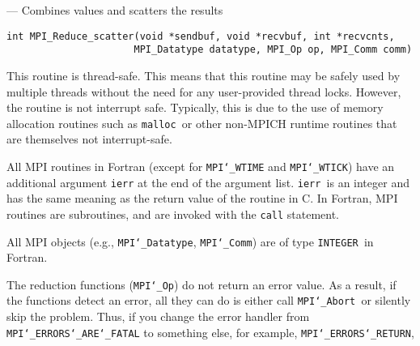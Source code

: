 \startmanpage
{}
--- Combines values and scatters the results 
\startvb\begin{verbatim}
int MPI_Reduce_scatter(void *sendbuf, void *recvbuf, int *recvcnts, 
                      MPI_Datatype datatype, MPI_Op op, MPI_Comm comm)

\end{verbatim}
\endvb

\par
{}
\par
{}
\par
This routine is thread-safe.  This means that this routine may be
safely used by multiple threads without the need for any user-provided
thread locks.  However, the routine is not interrupt safe.  Typically,
this is due to the use of memory allocation routines such as {\tt malloc
}or other non-MPICH runtime routines that are themselves not interrupt-safe.
\par
{}
All MPI routines in Fortran (except for {\tt MPI{\tt \char`\_}WTIME} and {\tt MPI{\tt \char`\_}WTICK}) have
an additional argument {\tt ierr} at the end of the argument list.  {\tt ierr
}is an integer and has the same meaning as the return value of the routine
in C.  In Fortran, MPI routines are subroutines, and are invoked with the
{\tt call} statement.
\par
All MPI objects (e.g., {\tt MPI{\tt \char`\_}Datatype}, {\tt MPI{\tt \char`\_}Comm}) are of type {\tt INTEGER
}in Fortran.
\par
{}
\par
The reduction functions ({\tt MPI{\tt \char`\_}Op}) do not return an error value.  As a result,
if the functions detect an error, all they can do is either call {\tt MPI{\tt \char`\_}Abort
}or silently skip the problem.  Thus, if you change the error handler from
{\tt MPI{\tt \char`\_}ERRORS{\tt \char`\_}ARE{\tt \char`\_}FATAL} to something else, for example, {\tt MPI{\tt \char`\_}ERRORS{\tt \char`\_}RETURN},
